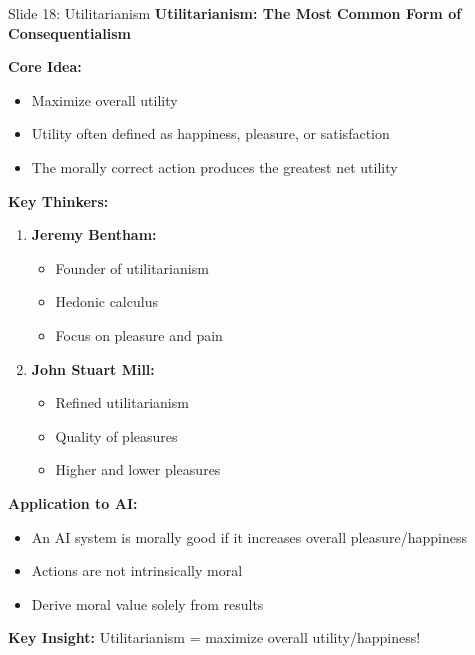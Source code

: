 \documentclass[8pt]{beamer}
\begin{document}
	\begin{frame}{Slide 18: Utilitarianism}
		\fontsize{6.5}{7.5}\selectfont
		\textbf{Utilitarianism: The Most Common Form of Consequentialism}
		
		\vspace{0.1cm}
		\textbf{Core Idea:}
		\begin{itemize}
			\item Maximize overall utility
			\item Utility often defined as happiness, pleasure, or satisfaction
			\item The morally correct action produces the greatest net utility
		\end{itemize}
		
		\vspace{0.1cm}
		\textbf{Key Thinkers:}
		\begin{enumerate}
			\item \textbf{Jeremy Bentham:}
			\begin{itemize}
				\item Founder of utilitarianism
				\item Hedonic calculus
				\item Focus on pleasure and pain
			\end{itemize}
			\item \textbf{John Stuart Mill:}
			\begin{itemize}
				\item Refined utilitarianism
				\item Quality of pleasures
				\item Higher and lower pleasures
			\end{itemize}
		\end{enumerate}
		
		\vspace{0.1cm}
		\textbf{Application to AI:}
		\begin{itemize}
			\item An AI system is morally good if it increases overall pleasure/happiness
			\item Actions are not intrinsically moral
			\item Derive moral value solely from results
		\end{itemize}
		
		\textcolor{myblue}{\textbf{Key Insight:}} Utilitarianism = \textcolor{myblue}{maximize overall utility/happiness}!
	\end{frame}
	
\end{document}
